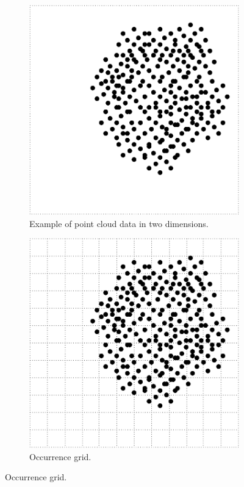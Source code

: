 \begin{figure}[ht]
    \centering
    
    \begin{subfigure}[t]{0.4\textwidth}
        \includegraphics[width=\textwidth]{figs/implementation/point-cloud-plot.pdf}
        \caption{Example of point cloud data in two dimensions.}
    \end{subfigure}
    \begin{subfigure}[t]{0.4\textwidth}
        \includegraphics[width=\textwidth]{figs/implementation/occurrence-grid.pdf}
        \caption{Occurrence grid.}
    \end{subfigure}
    

\end{figure}
